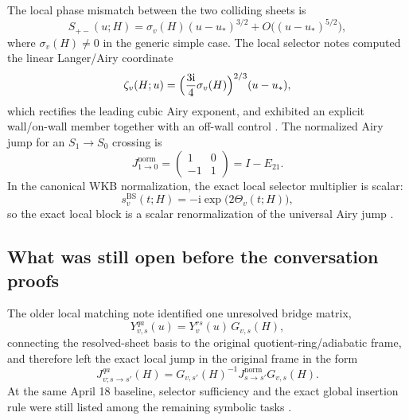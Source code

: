 \documentclass[11pt]{article}
\numberwithin{equation}{section}
\theoremstyle{definition}
\newcommand{\ii}{\mathrm i}
\begin{document}
The local phase mismatch between the two colliding sheets is
\begin{equation}
\label{eq:local-singulant}
 S_{+-}(u;H)=\sigma_v(H)(u-u_*)^{3/2}+O\bigl((u-u_*)^{5/2}\bigr),
\end{equation}
where $\sigma_v(H)\neq 0$ in the generic simple case. The local selector notes computed the linear Langer/Airy coordinate
\begin{equation}
\label{eq:linear-zeta}
 \zeta_v(H;u)=\Bigl(\frac{3\ii}{4}\sigma_v(H)\Bigr)^{2/3}(u-u_*),
\end{equation}
which rectifies the leading cubic Airy exponent, and exhibited an explicit wall/on-wall member together with an off-wall control \cite{LocalMatching}. The normalized Airy jump for an $S_1\to S_0$ crossing is
\begin{equation}
\label{eq:Airy-jump}
 J^{\mathrm{norm}}_{1\to 0}=\begin{pmatrix}1&0\\-1&1\end{pmatrix}=I-E_{21}.
\end{equation}
In the canonical WKB normalization, the exact local selector multiplier is scalar:
\begin{equation}
\label{eq:scalar-multiplier}
 s_v^{\mathrm{BS}}(t;H)=-\ii\exp\!\bigl(2\Theta_v(t;H)\bigr),
\end{equation}
so the exact local block is a scalar renormalization of the universal Airy jump \cite{MainApril18,SuppApril18,TransportPhase}.

\subsection{What was still open before the conversation proofs}

The older local matching note identified one unresolved bridge matrix,
\begin{equation}
\label{eq:old-G-vs}
 Y^{qa}_{v,s}(u)=Y^{rs}_v(u)\,G_{v,s}(H),
\end{equation}
connecting the resolved-sheet basis to the original quotient-ring/adiabatic frame, and therefore left the exact local jump in the original frame in the form
\begin{equation}
\label{eq:old-jump}
 J^{qa}_{v;s\to s'}(H)=G_{v,s'}(H)^{-1}J^{\mathrm{norm}}_{s\to s'}G_{v,s}(H).
\end{equation}
At the same April 18 baseline, selector sufficiency and the exact global insertion rule were still listed among the remaining symbolic tasks \cite{LocalMatching,SuppApril18,MainApril18}.
\end{document}
